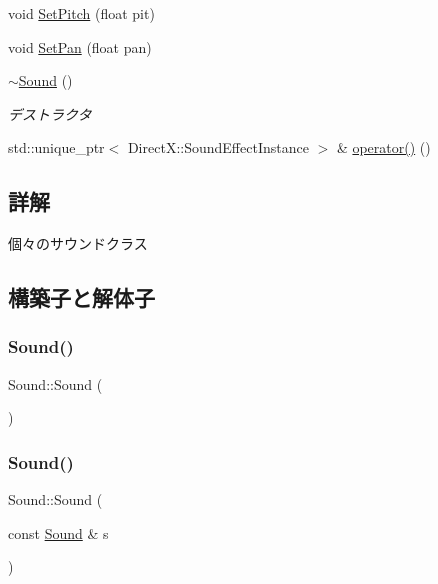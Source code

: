 \begin{DoxyCompactItemize}
\item 
void \mbox{\hyperlink{class_sound_a06b9680efb2b6b41b52d9f25ac0264f1}{Set\+Pitch}} (float pit)
\item 
void \mbox{\hyperlink{class_sound_a1b066e78405656b1475849139ca24dce}{Set\+Pan}} (float pan)
\item 
\mbox{\hyperlink{class_sound_a0907389078bf740be2a5763366ad3376}{$\sim$\+Sound}} ()
\begin{DoxyCompactList}\small\item\em デストラクタ \end{DoxyCompactList}\item 
std\+::unique\+\_\+ptr$<$ Direct\+X\+::\+Sound\+Effect\+Instance $>$ \& \mbox{\hyperlink{class_sound_a0d79b20f421c0020c53b08c05b6df25b}{operator()}} ()
\end{DoxyCompactItemize}


\subsection{詳解}
個々のサウンドクラス 

\subsection{構築子と解体子}
\mbox{\label{class_sound_a539c205cdf06fe2c621fd77c37bcfac9}} 
\subsubsection{\texorpdfstring{Sound()}{Sound()}\hspace{0.1cm}{\footnotesize\ttfamily [1/3]}}
{\footnotesize\ttfamily Sound\+::\+Sound (\begin{DoxyParamCaption}{ }\end{DoxyParamCaption})\hspace{0.3cm}{\ttfamily [inline]}}

\mbox{\label{class_sound_adbdf520a7124095c93390f43d78051ff}} 
\subsubsection{\texorpdfstring{Sound()}{Sound()}\hspace{0.1cm}{\footnotesize\ttfamily [2/3]}}
{\footnotesize\ttfamily Sound\+::\+Sound (\begin{DoxyParamCaption}\item[{const \mbox{\hyperlink{class_sound}{Sound}} \&}]{s }\end{DoxyParamCaption})\hspace{0.3cm}{\ttfamily [inline]}}

